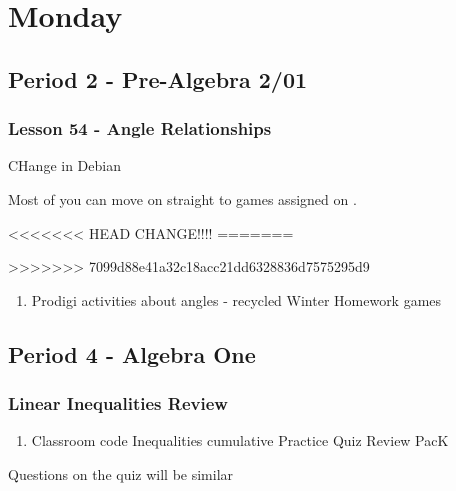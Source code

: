    \section[Mon]{Monday}
   \subsection[PA2/01]{Period 2 - Pre-Algebra 2/01}
   \begin{frame}[label=PA2_01]
   	\frametitle{Lesson 54 - Angle Relationships}

    CHange in Debian

   \begin{alertblock}{}
   	Most of you can move on straight to  games assigned on \mangahightext. \\
   \end{alertblock}
<<<<<<< HEAD
      CHANGE!!!!
=======

>>>>>>> 7099d88e41a32c18acc21dd6328836d7575295d9
      \begin{enumerate}
        \item \mangahightext
        \rightarrowitem Prodigi activities about angles - recycled Winter Homework
        \rightarrowitem {} games
      \end{enumerate}
   	  \end{frame}

     \subsection[ALG]{Period 4 - Algebra One}
   	 \begin{frame}[label=ALG1]
   	 	\frametitle{Linear Inequalities Review}

      \begin{enumerate}
   	    \item {} Classroom code 
        \rightarrowitem Inequalities cumulative Practice
        \rightarrowitem Quiz Review PacK
      \end{enumerate}

      \begin{alertblock}{}
        Questions on the quiz will be similar
     \end{alertblock}
   	  \end{frame}

